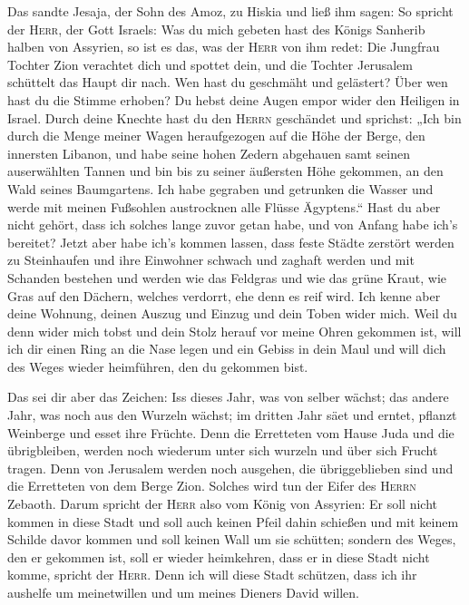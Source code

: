  Das sandte Jesaja, der Sohn des Amoz, zu Hiskia und ließ
ihm sagen: So spricht der \textsc{Herr}, der Gott Israels: Was du mich
gebeten hast des Königs Sanherib halben von Assyrien,  so
ist es das, was der \textsc{Herr} von ihm redet: Die Jungfrau Tochter
Zion verachtet dich und spottet dein, und die Tochter Jerusalem
schüttelt das Haupt dir nach.  Wen hast du geschmäht und
gelästert? Über wen hast du die Stimme erhoben? Du hebst deine Augen
empor wider den Heiligen in Israel.  Durch deine Knechte
hast du den \textsc{Herrn} geschändet und sprichst: „Ich bin durch die
Menge meiner Wagen heraufgezogen auf die Höhe der Berge, den innersten
Libanon, und habe seine hohen Zedern abgehauen samt seinen auserwählten
Tannen und bin bis zu seiner äußersten Höhe gekommen, an den Wald seines
Baumgartens.  Ich habe gegraben und getrunken die Wasser
und werde mit meinen Fußsohlen austrocknen alle Flüsse Ägyptens.``
 Hast du aber nicht gehört, dass ich solches lange zuvor
getan habe, und von Anfang habe ich's bereitet? Jetzt aber habe ich's
kommen lassen, dass feste Städte zerstört werden zu Steinhaufen
 und ihre Einwohner schwach und zaghaft werden und mit
Schanden bestehen und werden wie das Feldgras und wie das grüne Kraut,
wie Gras auf den Dächern, welches verdorrt, ehe denn es reif wird.
 Ich kenne aber deine Wohnung, deinen Auszug und Einzug
und dein Toben wider mich.  Weil du denn wider mich tobst
und dein Stolz herauf vor meine Ohren gekommen ist, will ich dir einen
Ring an die Nase legen und ein Gebiss in dein Maul und will dich des
Weges wieder heimführen, den du gekommen bist.

 Das sei dir aber das Zeichen: Iss dieses Jahr, was von
selber wächst; das andere Jahr, was noch aus den Wurzeln wächst; im
dritten Jahr säet und erntet, pflanzt Weinberge und esset ihre Früchte.
 Denn die Erretteten vom Hause Juda und die übrigbleiben,
werden noch wiederum unter sich wurzeln und über sich Frucht tragen.
 Denn von Jerusalem werden noch ausgehen, die
übriggeblieben sind und die Erretteten von dem Berge Zion. Solches wird
tun der Eifer des \textsc{Herrn} Zebaoth.  Darum spricht
der \textsc{Herr} also vom König von Assyrien: Er soll nicht kommen in
diese Stadt und soll auch keinen Pfeil dahin schießen und mit keinem
Schilde davor kommen und soll keinen Wall um sie schütten;
 sondern des Weges, den er gekommen ist, soll er wieder
heimkehren, dass er in diese Stadt nicht komme, spricht der
\textsc{Herr}.  Denn ich will diese Stadt schützen, dass
ich ihr aushelfe um meinetwillen und um meines Dieners David willen.

